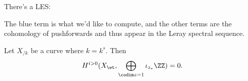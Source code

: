 \begin{corollary}[?]

There's a LES:

\begin{center}
\end{center}

The blue term is what we'd like to compute, and the other terms are the
cohomology of pushforwards and thus appear in the Leray spectral
sequence.

\end{corollary}

\begin{proposition}[?]

Let \(X_{/k}\) be a curve where \(k=k^{s}\). Then
\begin{align*}  
H^{i>0}(X_\et, \bigoplus_{\codim z = 1} \iota_{z_*} \ZZ) = 0
.\end{align*}

\end{proposition}

